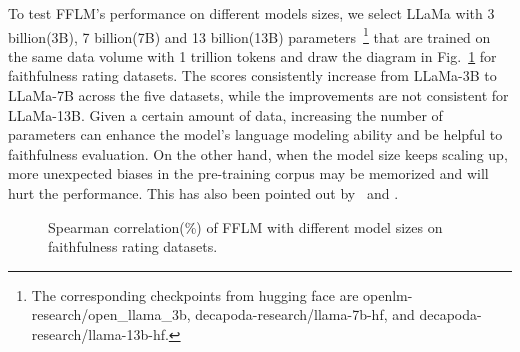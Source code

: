 To test FFLM's performance on different models sizes, we select LLaMa with 3 billion(3B), 7 billion(7B) and 13 billion(13B) parameters~\footnote{The corresponding checkpoints from hugging face are openlm-research/open\_llama\_3b, decapoda-research/llama-7b-hf, and decapoda-research/llama-13b-hf.} that are trained on the same data volume with 1 trillion tokens and draw the diagram in Fig.~\ref{fig:sizes-fr} for faithfulness rating datasets.
The scores consistently increase from LLaMa-3B to LLaMa-7B across the five datasets, while the improvements are not consistent for LLaMa-13B. 
Given a certain amount of data, increasing the number of parameters can enhance the model's language modeling ability and be helpful to faithfulness evaluation. On the other hand, when the model size keeps scaling up, more unexpected biases in the pre-training corpus may be memorized and will hurt the performance. 
This has also been pointed out by~\citet{ranaldi2023trip} and \citet{nadeem2021stereoset}. 

\begin{figure}[t]
	\centering
	\begin{minipage}[t]{\linewidth}
		\centering
	\end{minipage}%
	\caption{Spearman correlation(\%) of FFLM with different model sizes on faithfulness rating datasets.}
	\label{fig:sizes-fr}
\end{figure}


